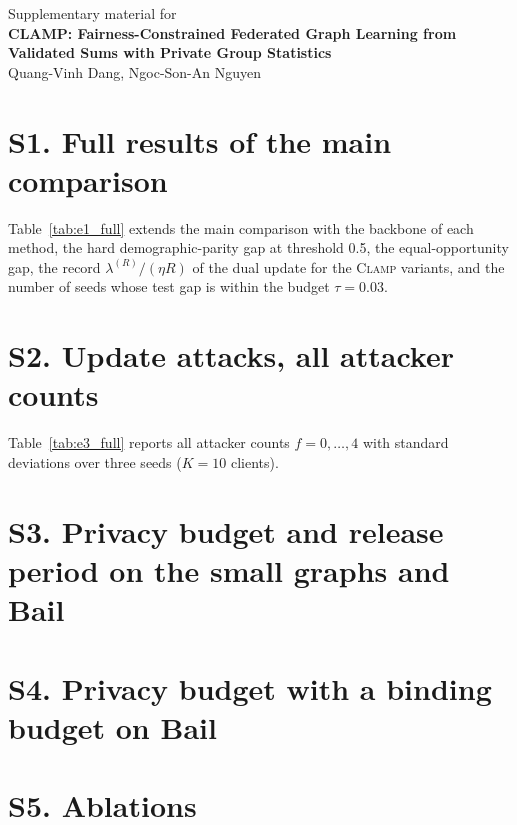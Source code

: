 \documentclass[preprint,12pt]{elsarticle}
\newcommand{\clamp}{\textsc{Clamp}}
\begin{document}
\begin{center}
{\Large Supplementary material for}\\[4pt]
{\large\textbf{CLAMP: Fairness-Constrained Federated Graph Learning from Validated Sums with Private Group Statistics}}\\[6pt]
Quang-Vinh Dang, Ngoc-Son-An Nguyen
\end{center}

\section*{S1. Full results of the main comparison}
Table~\ref{tab:e1_full} extends the main comparison with the backbone of each method, the hard demographic-parity gap at threshold 0.5, the equal-opportunity gap, the record $\lambda^{(R)}/(\eta R)$ of the dual update for the \clamp{} variants, and the number of seeds whose test gap is within the budget $\tau=0.03$.



\section*{S2. Update attacks, all attacker counts}
Table~\ref{tab:e3_full} reports all attacker counts $f=0,\dots,4$ with standard deviations over three seeds ($K=10$ clients).



\section*{S3. Privacy budget and release period on the small graphs and Bail}


\section*{S4. Privacy budget with a binding budget on Bail}


\section*{S5. Ablations}

\end{document}
